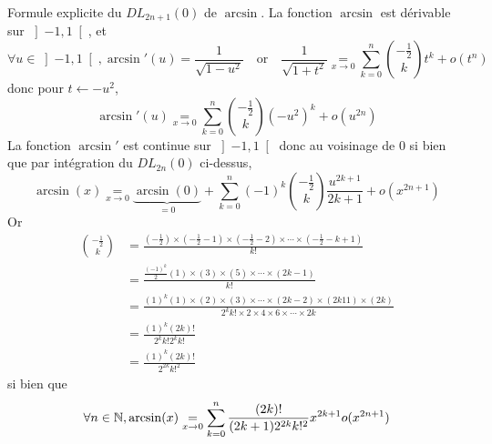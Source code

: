 \documentclass{article}
\renewenvironment{question_kholle}[2][ ]
{
	\subsection{\texorpdfstring{#2}{}}
	\notblank{#1}
	{
		\noindent #1
		\bigbreak
	}
	{}
	\begin{proof}
}
{
	\end{proof}
}
\begin{document}
\begin{question_kholle}{Formule explicite du $DL_{2n+1}(0)$ de $\arcsin$.}
	La fonction $\arcsin$ est dérivable sur $\left]-1, 1\right[$, et
			\[
			\forall u\in\left]-1,1\right[, \arcsin'(u) = \frac{1}{\sqrt{1-u^{2}}} \quad\text{or}\quad \frac{1}{\sqrt{1+t^{2}}}\underset{x\to 0}{=} \sum_{k=0}^{n}\binom{-\frac{1}{2}}{k}t^{k} +o(t^{n})
		\]
		donc pour $t\leftarrow -u^{2}$,
		\[
			\arcsin '(u) \underset{x\to 0}{=}\sum_{k=0}^{n}\binom{-\frac{1}{2}}{k}(-u^{2})^{k}+o(u^{2n})
		\]
		La fonction $\arcsin'$ est continue sur $\left]-1, 1\right[$ donc au voisinage de 0 si bien que par intégration du $DL_{2n}(0)$ ci-dessus,
	\[
		\arcsin(x) \underset{x\to 0}{=} \underbrace{\arcsin(0)}_{=0} + \sum_{k=0}^{n}(-1)^{k}\binom{-\frac{1}{2}}{k}\frac{u^{2k+1}}{2k+1} + o(x^{2n+1})
	\]
	Or
	\begin{align*}
		\binom{-\frac{1}{2}}{k} & =\frac{\left(-\frac{1}{2}\right)\times \left(-\frac{1}{2}-1\right)\times \left(-\frac{1}{2}-2\right)\times \cdots \times \left(-\frac{1}{2}-k+1\right)}{k!} \\
		                        & =\frac{\frac{(-1)^{k}}{2}(1)\times (3)\times (5)\times \cdots \times (2k-1)}{k!}                                                                            \\
		                        & = \frac{(1)^{k} (1)\times (2)\times (3)\times \cdots \times (2k-2) \times (2k11)\times (2k)}{2^{k}k! \times 2 \times 4 \times 6 \times \cdots \times 2k}    \\
		                        & = \frac{(1)^{k}(2k)!}{2^{k}k!2^{k}k!}                                                                                                                       \\
		                        & = \frac{(1)^{k}(2k)!}{2^{2k}k!^{2}}
	\end{align*}
	si bien que
	\[
		\forall n\in\mathbb N, \arcsin(x) \underset{x\to 0}{=}\sum_{k=0}^{n}\frac{(2k)!}{(2k+1)2^{2k}k!^{2}}x^{2k+1}o(x^{2n+1})
	\]
\end{question_kholle}
\end{document}

